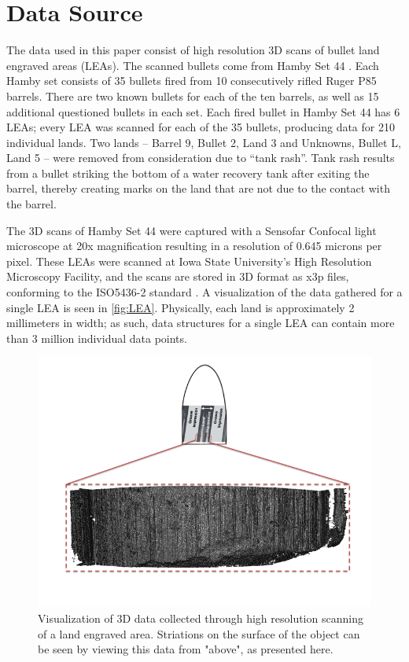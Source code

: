 \documentclass[]{article}
\begin{document}
\section{Data Source}

The data used in this paper consist of high resolution 3D scans of
bullet land engraved areas (LEAs). The scanned bullets come from Hamby
Set 44 \citep{Hamby}. Each Hamby set consists of 35 bullets fired from
10 consecutively rifled Ruger P85 barrels. There are two known bullets
for each of the ten barrels, as well as 15 additional questioned bullets
in each set. Each fired bullet in Hamby Set 44 has 6 LEAs; every LEA was
scanned for each of the 35 bullets, producing data for 210 individual
lands. Two lands -- Barrel 9, Bullet 2, Land 3 and Unknowns, Bullet L,
Land 5 -- were removed from consideration due to ``tank rash''. Tank
rash results from a bullet striking the bottom of a water recovery tank
after exiting the barrel, thereby creating marks on the land that are
not due to the contact with the barrel.

The 3D scans of Hamby Set 44 were captured with a Sensofar Confocal
light microscope at 20x magnification resulting in a resolution of 0.645
microns per pixel. These LEAs were scanned at Iowa State University's
High Resolution Microscopy Facility, and the scans are stored in 3D
format as x3p files, conforming to the ISO5436-2 standard
\citep{ISO5436}. A visualization of the data gathered for a single LEA
is seen in \autoref{fig:LEA}. Physically, each land is approximately 2
millimeters in width; as such, data structures for a single LEA can
contain more than 3 million individual data points.

\begin{figure}
\includegraphics[width=\textwidth]{./images/3d_plot_top_context_breakoff} \caption{\label{LEA}Visualization of 3D data collected through high resolution scanning of a land engraved area. Striations on the surface of the object can be seen by viewing this data from "above", as presented here.}\label{fig:LEA}
\end{figure}
\end{document}

